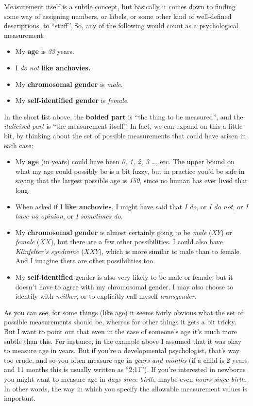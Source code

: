 \documentclass[
  a4paper,
]{book}
\providecommand{\tightlist}{%
  \setlength{\itemsep}{0pt}\setlength{\parskip}{0pt}}
\begin{document}
Measurement itself is a subtle concept, but basically it comes down to
finding some way of assigning numbers, or labels, or some other kind of
well-defined descriptions, to ``stuff''. So, any of the following would
count as a psychological measurement:

\begin{itemize}
\tightlist
\item
  My \textbf{age} is \emph{33} years.
\item
  I \emph{do not} \textbf{like anchovies.}
\item
  My \textbf{chromosomal gender} is \emph{male}.
\item
  My \textbf{self-identified gender} is \emph{female}.
\end{itemize}

In the short list above, the \textbf{bolded part} is ``the thing to be
measured'', and the \emph{italicised part} is ``the measurement
itself''. In fact, we can expand on this a little bit, by thinking about
the set of possible measurements that could have arisen in each case:

\begin{itemize}
\tightlist
\item
  My \textbf{age} (in years) could have been \emph{0, 1, 2, 3} \ldots,
  etc. The upper bound on what my age could possibly be is a bit fuzzy,
  but in practice you'd be safe in saying that the largest possible age
  is \emph{150}, since no human has ever lived that long.
\item
  When asked if I \textbf{like anchovies}, I might have said that
  \emph{I do}, or \emph{I do not}, or \emph{I have no opinion}, or
  \emph{I sometimes do.}
\item
  My \textbf{chromosomal gender} is almost certainly going to be
  \emph{male} (\(XY\)) or \emph{female} (\(XX\)), but there are a few
  other possibilities. I could also have \emph{Klinfelter's syndrome}
  (\(XXY\)), which is more similar to male than to female. And I imagine
  there are other possibilities too.
\item
  My \textbf{self-identified} gender is also very likely to be male or
  female, but it doesn't have to agree with my chromosomal gender. I may
  also choose to identify with \emph{neither}, or to explicitly call
  myself \emph{transgender}.
\end{itemize}

As you can see, for some things (like age) it seems fairly obvious what
the set of possible measurements should be, whereas for other things it
gets a bit tricky. But I want to point out that even in the case of
someone's age it's much more subtle than this. For instance, in the
example above I assumed that it was okay to measure age in years. But if
you're a developmental psychologist, that's way too crude, and so you
often measure age in \emph{years and months} (if a child is 2 years and
11 months this is usually written as ``2;11''). If you're interested in
newborns you might want to measure age in \emph{days since birth}, maybe
even \emph{hours since birth}. In other words, the way in which you
specify the allowable measurement values is important.
\end{document}
